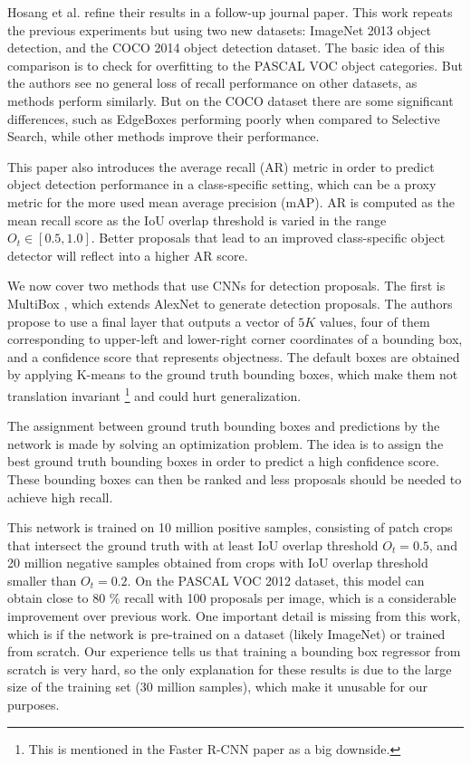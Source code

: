 Hosang et al. \cite{hosang2016makes} refine their results in a follow-up journal paper. This work repeats the previous experiments but using two new datasets: ImageNet 2013 object detection, and the COCO 2014 object detection dataset. The basic idea of this comparison is to check for overfitting to the PASCAL VOC object categories. But the authors see no general loss of recall performance on other datasets, as methods perform similarly. But on the COCO dataset there are some significant differences, such as EdgeBoxes performing poorly when compared to Selective Search, while other methods improve their performance.

This paper also introduces the average recall (AR) metric in order to predict object detection performance in a class-specific setting, which can be a proxy metric for the more used mean average precision (mAP). AR is computed as the mean recall score as the IoU overlap threshold is varied in the range $O_t \in [0.5, 1.0]$. Better proposals that lead to an improved class-specific object detector will reflect into a higher AR score.

We now cover two methods that use CNNs for detection proposals. The first is MultiBox \cite{erhan2014scalable}, which extends AlexNet to generate detection proposals. The authors propose to use a final layer that outputs a vector of $5K$ values, four of them corresponding to upper-left and lower-right corner coordinates of a bounding box, and a confidence score that represents objectness. The default boxes are obtained by applying K-means to the ground truth bounding boxes, which make them not translation invariant \footnote{This is mentioned in the Faster R-CNN paper as a big downside.} and could hurt generalization.

The assignment between ground truth bounding boxes and predictions by the network is made by solving an optimization problem. The idea is to assign the best ground truth bounding boxes in order to predict a high confidence score. These bounding boxes can then be ranked and less proposals should be needed to achieve high recall.

This network is trained on 10 million positive samples, consisting of patch crops that intersect the ground truth with at least IoU overlap threshold $O_t = 0.5$, and 20 million negative samples obtained from crops with IoU overlap threshold smaller than $O_t = 0.2$. On the PASCAL VOC 2012 dataset, this model can obtain close to $80$ \% recall with 100 proposals per image, which is a considerable improvement over previous work. One important detail is missing from this work, which is if the network is pre-trained on a dataset (likely ImageNet) or trained from scratch. Our experience tells us that training a bounding box regressor from scratch is very hard, so the only explanation for these results is due to the large size of the training set (30 million samples), which make it unusable for our purposes.


